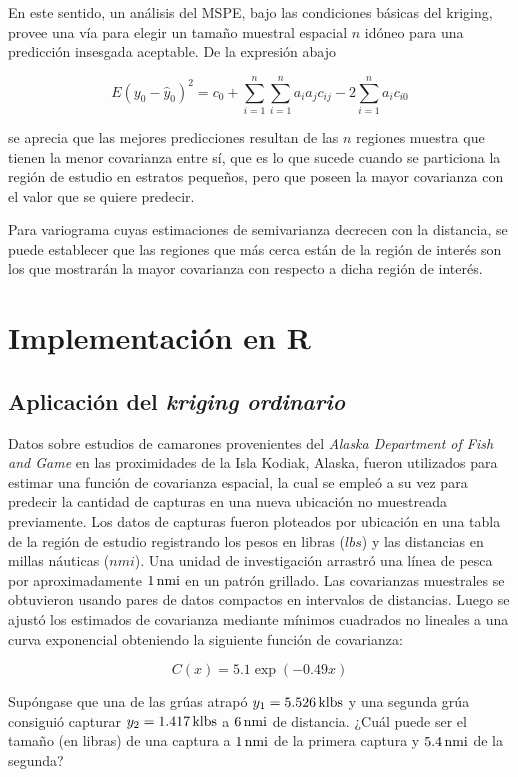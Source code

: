 \documentclass[14pt]{extarticle}
\newenvironment{example}[1][Ejemplo]{\begin{trivlist}
		\item[\hskip \labelsep {\bfseries #1}]}{\end{trivlist}}
\begin{document}
En este sentido, un análisis del MSPE, bajo las condiciones básicas del kriging, provee una vía para elegir un tamaño muestral espacial $n$ idóneo para una predicción insesgada aceptable. De la expresión abajo

$$E\left(y_0 - \hat{y}_0\right)^2 = c_0 + \sum_{i=1}^{n}\sum_{i=1}^{n}a_i a_j c_{ij} -2 \sum_{i=1}^{n}a_i c_{i0}$$

\noindent se aprecia que las mejores predicciones resultan de las $n$ regiones muestra que tienen la menor covarianza entre sí, que es lo que sucede cuando se particiona la región de estudio en estratos pequeños\cite{Thompson.2012}, pero que poseen la mayor covarianza con el valor que se quiere predecir. 

Para variograma cuyas estimaciones de semivarianza decrecen con la distancia, se puede establecer que las regiones que más cerca están de la región de interés son los que mostrarán la mayor covarianza con respecto a dicha región de interés\cite{Thompson.2012}. 

\section{Implementación en R}
\subsection{Aplicación del \textit{kriging ordinario}}
\begin{example}[Ejemplo 1: Predicción por \textit{kriging ordinario}]
	Datos sobre estudios de camarones provenientes del \textit{Alaska Department of Fish and Game} en las proximidades de la Isla Kodiak, Alaska, fueron utilizados para estimar una función de covarianza espacial, la cual se empleó a su vez para predecir la cantidad de capturas en una nueva ubicación no muestreada previamente. Los datos de capturas fueron ploteados por ubicación en una tabla de la región de estudio registrando los pesos en libras ($\unit{lbs}$) y las distancias en millas náuticas ($\unit{nmi}$). Una unidad de investigación arrastró una línea de pesca por aproximadamente $\unit[1]{nmi}$ en un patrón grillado. Las covarianzas muestrales se obtuvieron usando pares de datos compactos en intervalos de distancias. Luego se ajustó los estimados de covarianza mediante mínimos cuadrados no lineales a una curva exponencial obteniendo la siguiente función de covarianza:
	
	\begin{equation*}
		C(x) = 5.1 \exp(-0.49x)
	\end{equation*}
	
	Supóngase que una de las grúas atrapó $y_1 = \unit[5.526]{klbs}$ y una segunda grúa consiguió capturar $y_2 = \unit[1.417]{klbs}$ a $\unit[6]{nmi}$ de distancia. ¿Cuál puede ser el tamaño (en libras) de una captura a $\unit[1]{nmi}$ de la primera captura y $\unit[5.4]{nmi}$ de la segunda?
\end{example}\label{ejemplo1_camarones}
\end{document}
